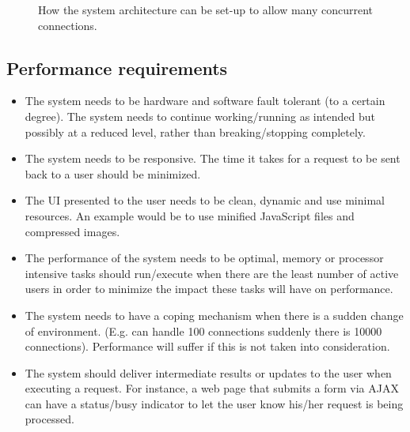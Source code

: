 \documentclass[a4paper,12pt]{article}
\begin{document}
\begin{itemize}
\begin{figure}[H]
		\caption{How the system architecture can be set-up to allow many concurrent connections.}
		\label{fig:scalability}
	\end{figure}
\end{itemize}
\subsection{Performance requirements}
\begin{itemize}
	\item The system needs to be hardware and software fault tolerant (to a certain degree). The system needs to continue working/running as intended but possibly at a reduced level, rather than breaking/stopping completely.
	\item The system needs to be responsive. The time it takes for a request to be sent back to a user should be minimized. 
	\item The UI presented to the user needs to be clean, dynamic and use minimal resources. An example would be to use minified JavaScript files and compressed images.
	\item The performance of the system needs to be optimal, memory or processor intensive tasks should run/execute when there are the least number of active users in order to minimize the impact these tasks will have on performance.
	\item The system needs to have a coping mechanism when there is a sudden change of environment. (E.g. can handle 100 connections suddenly there is 10000 connections). Performance will suffer if this is not taken into consideration.
	\item The system should deliver intermediate results or updates to the user when executing a request. For instance, a web page that submits a form via AJAX can have a status/busy indicator to let the user know his/her request is being processed.
\end{itemize}
\end{document}
